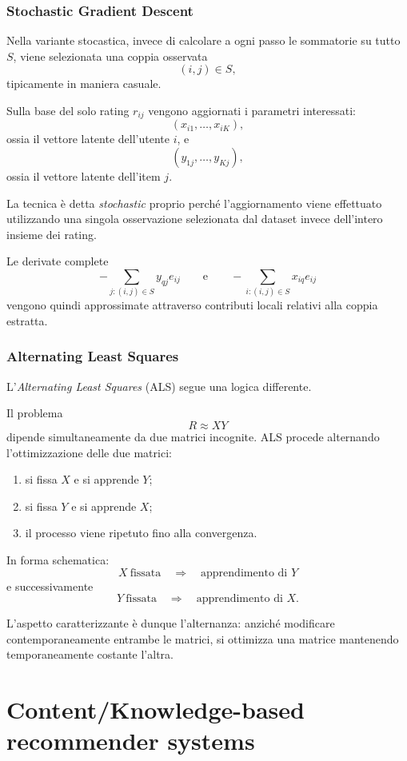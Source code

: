 \subsubsection{Stochastic Gradient Descent}

Nella variante stocastica, invece di calcolare a ogni passo le sommatorie su tutto $S$, viene selezionata una coppia osservata
\[
(i,j)\in S,
\]
tipicamente in maniera casuale.

Sulla base del solo rating $r_{ij}$ vengono aggiornati i parametri interessati:
\[
(x_{i1},\ldots,x_{iK}),
\]
ossia il vettore latente dell'utente $i$, e
\[
(y_{1j},\ldots,y_{Kj}),
\]
ossia il vettore latente dell'item $j$.

La tecnica è detta \emph{stochastic} proprio perché l'aggiornamento viene effettuato utilizzando una singola osservazione selezionata dal dataset invece dell'intero insieme dei rating.

Le derivate complete
\[
-
\sum_{j:(i,j)\in S}y_{qj}e_{ij}
\qquad\text{e}\qquad
-
\sum_{i:(i,j)\in S}x_{iq}e_{ij}
\]
vengono quindi approssimate attraverso contributi locali relativi alla coppia estratta.

\subsubsection{Alternating Least Squares}

L'\emph{Alternating Least Squares} (ALS) segue una logica differente.

Il problema
\[
R\approx XY
\]
dipende simultaneamente da due matrici incognite. ALS procede alternando l'ottimizzazione delle due matrici:
\begin{enumerate}
    \item si fissa $X$ e si apprende $Y$;
    \item si fissa $Y$ e si apprende $X$;
    \item il processo viene ripetuto fino alla convergenza.
\end{enumerate}

In forma schematica:
\[
\boxed{
X\ \text{fissata}
\quad\Longrightarrow\quad
\text{apprendimento di }Y
}
\]
e successivamente
\[
\boxed{
Y\ \text{fissata}
\quad\Longrightarrow\quad
\text{apprendimento di }X.
}
\]

L'aspetto caratterizzante è dunque l'alternanza: anziché modificare contemporaneamente entrambe le matrici, si ottimizza una matrice mantenendo temporaneamente costante l'altra.


\section{Content/Knowledge-based recommender systems}

